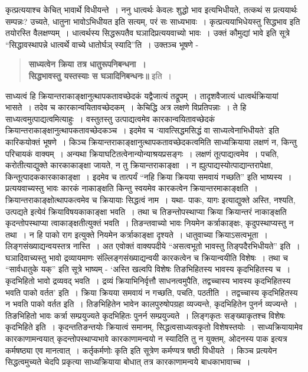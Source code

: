 {कृत्प्रत्ययाश्च केचित् भावार्थे विधीयन्ते~। ननु धात्वर्थः केवलः शुद्धो भाव इत्यभिधीयते, तत्कथं स प्रत्ययार्थः सम्पन्नः? उच्यते, धातुना भावोऽभिधीयत इति सत्यम्, परं सः साध्यभावः~। कृत्प्रत्ययाभिधेयस्तु सिद्धभाव इति तयोरस्ति वैलक्षण्यम्~। धात्वर्थस्य सिद्धरूपतैव घञादिप्रत्ययवाच्यो भावः~। उक्तं कौमुद्यां भावे इति सूत्रे “सिद्धावस्थापन्ने धात्वर्थे वाच्ये धातोर्घञ् स्यादि”ति~। उक्तञ्च भूषणे -
\begin{verse}
\textbf{साध्यत्वेन क्रिया तत्र धातुरूपनिबन्धना~। }\\
\textbf{सिद्धभावस्तु यस्तस्याः स घञादिनिबन्धनः॥} इति~। 
\end{verse}
साध्यत्वं हि क्रियान्तराकाङ्क्षानुत्थापकतावच्छेदकं यद्वैजात्यं तद्रूपम्~।     तादृशवैजात्यं धात्वर्थ\-क्रियायां भासते~। तदेव च कारकान्वयितावच्छेदकम्~। केचिद्धि अत्र लक्षणे विप्रतिपन्नाः~। ते हि साध्यत्वमुत्पाद्यत्वमित्याहुः~। वस्तुतस्तु उत्पाद्यत्वमेव कारकान्वयितावच्छेदकं क्रियान्त\-राकाङ्क्षानुत्थापकतावच्छेदकञ्च~। इदमेव च ‘यावत्सिद्धमसिद्धं वा साध्यत्वेनाभिधीयते’ इति कारिकयोक्तं भूषणे~। किञ्च क्रियान्तराकाङ्क्षानुत्थापकतावच्छेदकत्वमिति साध्यक्रियाया \-लक्षणं न, किन्तु परिचायकं वाक्यम्~। अन्यथा क्रियाघटितत्वेनान्योन्याश्रयप्रसङ्गः~। \break लक्षणं तूत्पाद्यत्वमेव~। पचति, करोतीत्याद्युक्ते कारकाकाङ्क्षा जायते, न तु क्रियान्तराकाङ्क्षा~। न ह्युत्पाद्यस्योत्पाद्यान्तरापेक्षा, किन्तूत्पादककारकाकाङ्क्षा~। इदमेव च तात्पर्यं “नहि क्रिया क्रियया समवायं गच्छति” इति भाष्यस्य~। प्रत्ययवाच्यस्तु भावः कारकं नाकाङ्क्षति किन्तु स्वयमेव कारकत्वेन क्रियान्तरमाकाङ्क्षति~। क्रियान्तराकाङ्क्षोत्थापकत्वमेव च क्रियायाः सिद्धत्वं नाम~। यथा- पाकः, यागः इत्याद्युक्ते अस्ति, नश्यति, उत्पद्यते इत्येवं क्रियाविषय\-काकाङ्क्षा भवति~। तथा च तिङन्तोपस्थाप्या क्रिया क्रियान्तरं नाकाङ्क्षति कृदन्तोपस्थाप्या त्वाकाङ्क्षतीत्युक्तं भवति~। तिङन्तवाच्यो भावः नियमेन कर्त्राकाङ्क्षः, कृदुपस्थाप्यस्तु न तथा~। न हि पाको राग इत्युक्ते नियमेन कर्त्राकाङ्क्षा दृश्यते~। धातुवाच्या क्रियाऽसत्वभूता~। लिङ्ग\-संख्याद्यन्वयस्तत्र नास्ति~। अत एवोक्तं वाक्यपदीये “असत्वभूतो भावस्तु तिङ्पदैरभिधीयते” इति~। घञादिवाच्यस्तु भावो द्रव्यायमाणः संल्लिङ्गसंख्याद्यन्वयी कारकत्वेन च क्रियान्वयीति विशेषः~। तथा च “सार्वधातुके यक्” इति सूत्रे भाष्यम् - ‘अस्ति खल्वपि विशेषः तिङभिहितस्य भावस्य कृदभिहितस्य च~। कृदभिहितो भावो द्रव्यवद् भवति~। द्रव्यं क्रियाभिनिर्वृत्तौ साधनत्वमुपैति, तद्वच्चास्य भावस्य कृदभिहितस्य भवति पाको वर्तत’ इति~। क्रिया क्रियया समवायं न गच्छति, पचति, पठतीति~। तद्वच्चास्य कृदभिहितस्य न भवति पाको वर्तत इति~। तिङभिहितेन भावेन कालपुरुषोपग्रहा व्यज्यन्ते, कृदभिहितेन पुनर्न व्यज्यन्ते~। तिङभिहितो भावः कर्त्रा सम्प्रयुज्यते कृदभिहितः पुनर्न सम्प्रयुज्यते~। लिङ्गकृतः सङ्ख्याकृतश्च विशेषः कृदभिहिते इति~। कृदन्ततिङन्तयोः क्रियात्वं समानम्, सिद्धत्वसाध्यत्वकृतो विशेषस्तयोः~। साध्यक्रियायामेव कारकाणामन्वयात् कृदन्तोपस्थाप्यभावे कारकाणामन्वयो न स्यादिति तु न युक्तम्, ओदनस्य पाक इत्यत्र कर्मषष्ठ्या एव मानत्वात्~। कर्तृकर्मणोः कृति इति सूत्रेण \-कर्मण्यत्र षष्ठी विधीयते~। किञ्च प्रत्ययेन सिद्धत्वमुच्यते चेदपि प्रकृत्या साध्यक्रियाया बोधात् तत्र कारकाणामन्वये बाधकाभावाच्च~। 

}
